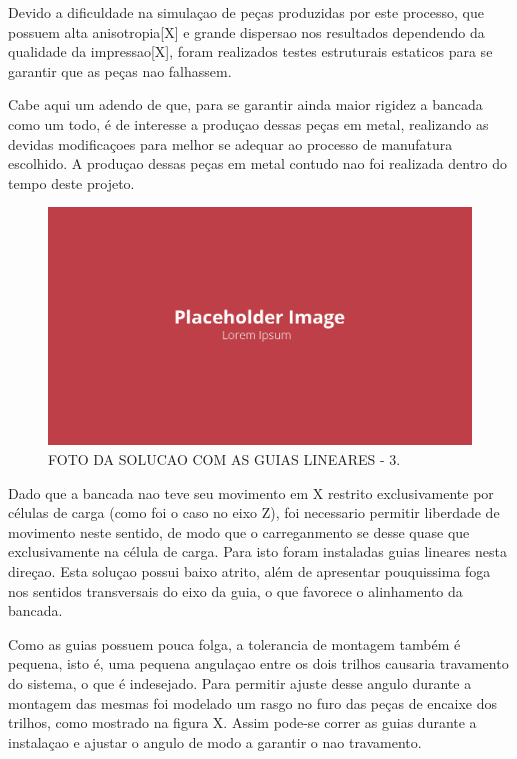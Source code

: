 Devido a dificuldade na simulaçao de peças produzidas por este processo, que possuem alta anisotropia[X] e grande dispersao nos resultados dependendo da qualidade da impressao[X], foram realizados testes estruturais estaticos para se garantir que as peças nao falhassem. 

Cabe aqui um adendo de que, para se garantir ainda maior rigidez a bancada como um todo, é de interesse a produçao dessas peças em metal, realizando as devidas modificaçoes para melhor se adequar ao processo de manufatura escolhido. A produçao dessas peças em metal contudo nao foi realizada dentro do tempo deste projeto.

\begin{figure}[!ht]
    \centering
    \includegraphics[width=.8\linewidth]{figuras/placeholder.png}
    \caption{FOTO DA SOLUCAO COM AS GUIAS LINEARES - 3\cite{autor}.}
    \label{fig:placeholder}
\end{figure}

Dado que a bancada nao teve seu movimento em X restrito exclusivamente por células de carga (como foi o caso no eixo Z), foi necessario permitir liberdade de movimento neste sentido, de modo que o carreganmento se desse quase que exclusivamente na célula de carga. Para isto foram instaladas guias lineares nesta direçao. Esta soluçao possui baixo atrito, além de apresentar pouquissima foga nos sentidos transversais do eixo da guia, o que favorece o alinhamento da bancada.

Como as guias possuem pouca folga, a tolerancia de montagem também é pequena, isto é, uma pequena angulaçao entre os dois trilhos causaria travamento do sistema, o que é indesejado. Para permitir ajuste desse angulo durante a montagem das mesmas foi modelado um rasgo no furo das peças de encaixe dos trilhos, como mostrado na figura X. Assim pode-se correr as guias durante a instalaçao e ajustar o angulo de modo a garantir o nao travamento.

